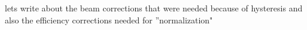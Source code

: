 lets write about the beam corrections that were needed because of hysteresis and also the efficiency corrections needed for ''normalization" 
%
%
